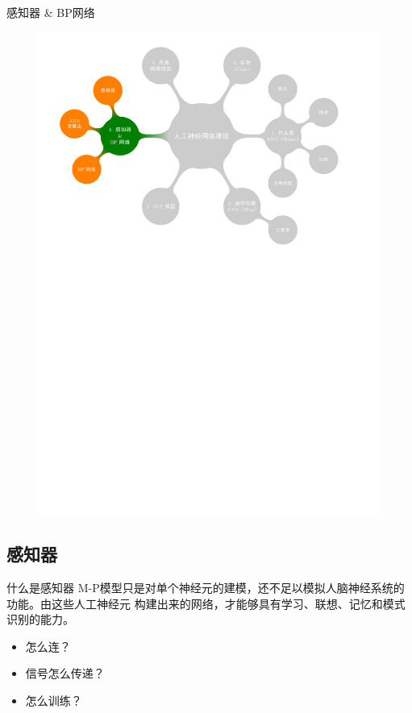 \documentclass[xcolor=svgnames]{beamer}
\begin{document}
\begin{frame}{感知器 \& BP网络}
    \vspace{-1em}
  \begin{figure}
    \centering
    \includegraphics[width=\textwidth]{mindmap/map5.pdf}
  \end{figure}
\end{frame}

\subsection{感知器}

\begin{frame}{什么是感知器}
  M-P模型只是对单个神经元的建模，还不足以模拟人脑神经系统的功能。由这些人工神经元
  构建出来的网络，才能够具有学习、联想、记忆和模式识别的能力。
  \begin{itemize}
  \item 怎么连？
  \item 信号怎么传递？
  \item 怎么训练？
  \end{itemize}
\end{frame}
\end{document}
